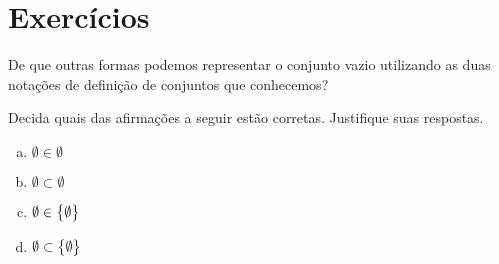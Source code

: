 \section{Exercícios}

\begin{exercise}
\label{exercicio-conjuntos-notacao}
	De que outras formas podemos representar o conjunto vazio utilizando as duas notações de definição de conjuntos que conhecemos?
\end{exercise}


\begin{exercise}
	Decida quais das afirmações a seguir estão corretas. Justifique suas respostas.
	\begin{enumerate}[a.]
		\item $\emptyset \in \emptyset$	
		\item $\emptyset \subset \emptyset$
		\item $\emptyset \in \left\{\emptyset\right\}$
		\item $\emptyset \subset \left\{\emptyset\right\}$
	\end{enumerate}
\end{exercise}


